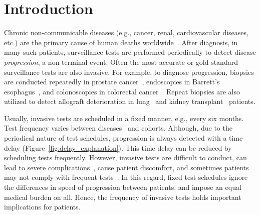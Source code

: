 \section{Introduction}
\label{sec:introduction}
Chronic non-communicable diseases (e.g., cancer, renal, cardiovascular diseases, etc.) are the primary cause of human deaths worldwide~\citep{alwan2010monitoring}. After diagnosis, in many such patients, surveillance tests are performed periodically to detect disease \textit{progression}, a non-terminal event. Often the most accurate or gold standard surveillance tests are also invasive. For example, to diagnose progression, biopsies are conducted repeatedly in prostate cancer~\citep{bokhorst2015compliance}, endoscopies in Barrett's esophagus~\citep{streitz1993endoscopic}, and colonoscopies in colorectal cancer~\citep{krist2007timing}. Repeat biopsies are also utilized to detect allograft deterioration in lung~\citep{mcwilliams2008surveillance} and kidney transplant~\citep{henderson2011surveillance} patients.

Usually, invasive tests are scheduled in a fixed manner, e.g., every six months. Test frequency varies between diseases~\citep{henderson2011surveillance,bokhorst2015compliance,krist2007timing} and cohorts. Although, due to the periodical nature of test schedules, progression is always detected with a time delay (Figure~\ref{fig:delay_explanation}). This time delay can be reduced by scheduling tests frequently. However, invasive tests are difficult to conduct, can lead to severe complications~\citep{loeb2013systematic,krist2007timing}, cause patient discomfort, and sometimes patients may not comply with frequent tests~\citep{bokhorst2015compliance}. In this regard, fixed test schedules ignore the differences in speed of progression between patients, and impose an equal medical burden on all. Hence, the frequency of invasive tests holds important implications for patients.

